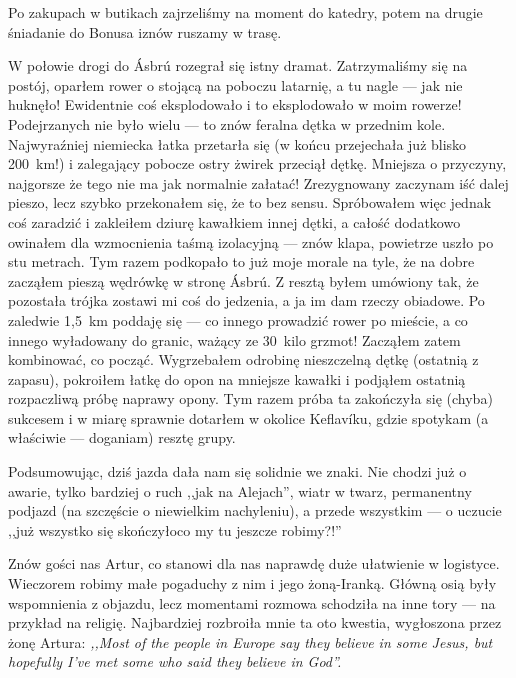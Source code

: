 Po zakupach w butikach zajrzeliśmy na moment do katedry, potem na drugie śniadanie do Bonusa i\textellipsis znów ruszamy w trasę.

W połowie drogi do Ásbrú rozegrał się istny dramat. Zatrzymaliśmy się na postój, oparłem rower o stojącą na poboczu latarnię, a tu nagle --- jak nie huknęło! Ewidentnie coś eksplodowało i to eksplodowało w moim rowerze! Podejrzanych nie było wielu --- to znów feralna dętka w przednim kole. Najwyraźniej niemiecka łatka przetarła się (w końcu przejechała już blisko 200~km!) i zalegający pobocze ostry żwirek przeciął dętkę. Mniejsza o przyczyny, najgorsze że tego nie ma jak normalnie załatać! Zrezygnowany zaczynam iść dalej pieszo, lecz szybko przekonałem się, że to bez sensu. Spróbowałem więc jednak coś zaradzić i zakleiłem dziurę kawałkiem innej dętki, a całość dodatkowo owinałem dla wzmocnienia taśmą izolacyjną --- znów klapa, powietrze uszło po stu metrach. Tym razem podkopało to już moje morale na tyle, że na dobre zacząłem pieszą wędrówkę w stronę Ásbrú. Z resztą byłem umówiony tak, że pozostała trójka zostawi mi coś do jedzenia, a ja im dam rzeczy obiadowe. Po zaledwie 1,5~km poddaję się --- co innego prowadzić rower po mieście, a co innego wyładowany do granic, ważący ze 30~kilo grzmot! Zacząłem zatem kombinować, co począć. Wygrzebałem odrobinę nieszczelną dętkę (ostatnią z zapasu), pokroiłem łatkę do opon na mniejsze kawałki i podjąłem ostatnią rozpaczliwą próbę naprawy opony. Tym razem próba ta zakończyła się (chyba) sukcesem i w miarę sprawnie dotarłem w okolice Keflavíku, gdzie spotykam (a właściwie --- doganiam) resztę grupy.

Podsumowując, dziś jazda dała nam się solidnie we znaki. Nie chodzi już o awarie, tylko bardziej o ruch ,,jak na Alejach'', wiatr w twarz, permanentny podjazd (na szczęście o niewielkim nachyleniu), a przede wszystkim --- o uczucie ,,już wszystko się skończyło\textellipsis co my tu jeszcze robimy?!''

Znów gości nas Artur, co stanowi dla nas naprawdę duże ułatwienie w logistyce. Wieczorem robimy małe pogaduchy z nim i jego żoną-Iranką. Główną osią były wspomnienia z objazdu, lecz momentami rozmowa schodziła na inne tory --- na przykład na religię. Najbardziej rozbroiła mnie ta oto kwestia, wygłoszona przez żonę Artura: \emph{,,Most of the people in Europe say they believe in some Jesus, but hopefully I’ve met some who said they believe in God''.}

